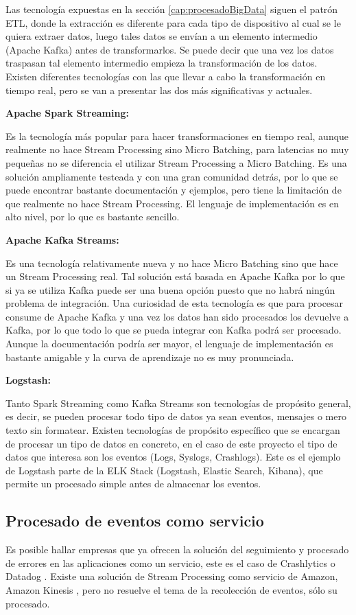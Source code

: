 Las tecnología expuestas en la sección \ref{cap:procesadoBigData} siguen el patrón ETL, donde la extracción es diferente para cada tipo de dispositivo al cual se le quiera extraer datos, luego tales datos se envían a un elemento intermedio (Apache Kafka) antes de transformarlos. Se puede decir que una vez los datos traspasan tal elemento intermedio empieza la transformación de los datos. Existen diferentes tecnologías con las que llevar a cabo la transformación en tiempo real, pero se van a presentar las dos más significativas y actuales.


\textbf{Apache Spark Streaming:}

Es la tecnología más popular para hacer transformaciones en tiempo real, aunque realmente no hace Stream Processing sino Micro Batching, para latencias no muy pequeñas no se diferencia el utilizar Stream Processing a Micro Batching. Es una solución ampliamente testeada y con una gran comunidad detrás, por lo que se puede encontrar bastante documentación y ejemplos, pero tiene la limitación de que realmente no hace Stream Processing. El lenguaje de implementación es en alto nivel, por lo que es bastante sencillo.

\textbf{Apache Kafka Streams:}

Es una tecnología relativamente nueva y no hace Micro Batching sino que hace un Stream Processing real. Tal solución está basada en Apache Kafka por lo que si ya se utiliza Kafka puede ser una buena opción puesto que no habrá ningún problema de integración. Una curiosidad de esta tecnología es que para procesar consume de Apache Kafka y una vez los datos han sido procesados los devuelve a Kafka, por lo que todo lo que se pueda integrar con Kafka podrá ser procesado. Aunque la documentación podría ser mayor, el lenguaje de implementación es bastante amigable y la curva de aprendizaje no es muy pronunciada.

\textbf{Logstash:}

Tanto Spark Streaming como Kafka Streams son tecnologías de propósito general, es decir, se pueden procesar todo tipo de datos ya sean eventos, mensajes o mero texto sin formatear. Existen tecnologías de propósito específico que se encargan de procesar un tipo de datos en concreto, en el caso de este proyecto el tipo de datos que interesa son los eventos (Logs, Syslogs, Crashlogs). Este es el ejemplo de Logstash parte de la ELK Stack (Logstash, Elastic Search, Kibana), que permite un procesado simple antes de almacenar los eventos.


\subsection{Procesado de eventos como servicio}
Es posible hallar empresas que ya ofrecen la solución del seguimiento y procesado de errores en las aplicaciones como un servicio, este es el caso de Crashlytics \cite{Tfg:crashlytics} o Datadog \cite{Tfg:datadog}. Existe una solución de Stream Processing como servicio de Amazon, Amazon Kinesis \cite{Tfg:kinesis}, pero no resuelve el tema de la recolección de eventos, sólo su procesado.

